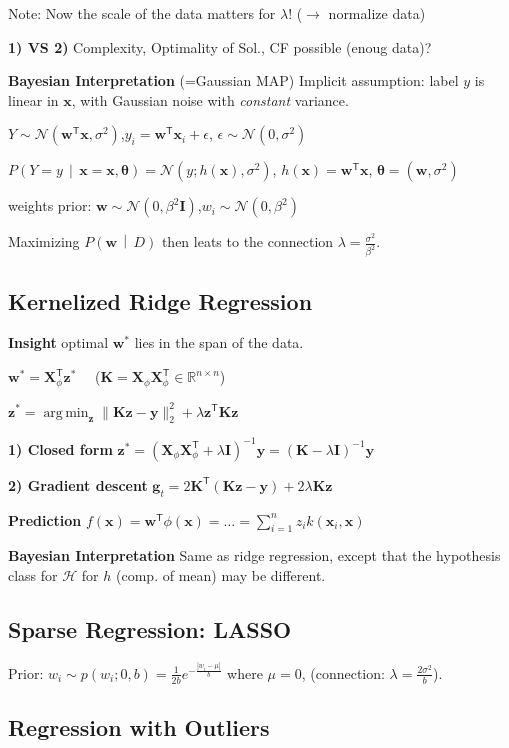 \documentclass[a4paper,8pt,landscape]{extarticle}
\newcommand{\R}{\mathbb{R}}
\newcommand{\cH}{\mathcal{H}}
\newcommand{\cN}{\mathcal{N}}
\newcommand{\abs}[1]{\left\lvert #1 \right\rvert}
\newcommand{\snorm}[1]{\lVert #1 \rVert}
\newcommand{\cProb}[2]{P\left( #1 \,\middle|\, #2 \right)}
\newcommand*{\T}{\mathsf{T}}
\DeclareMathOperator*{\argmin}{arg\,min}
\newcommand{\mat}[1]{\mathbf{#1}}
\renewcommand{\vec}[1]{\mathbf{#1}}
\newcommand{\vg}{\vec{g}}
\newcommand{\vw}{\vec{w}}
\newcommand{\vx}{\vec{x}}
\newcommand{\vy}{\vec{y}}
\newcommand{\vz}{\vec{z}}
\newcommand{\vtheta}{\boldsymbol{\theta}}
\newcommand{\MI}{\mat{I}}
\newcommand{\MK}{\mat{K}}
\newcommand{\MX}{\mat{X}}
\begin{document}
\begin{multicols*}{3}
Note: Now the scale of the data matters for $\lambda$! ($\rightarrow$ normalize
data)

\textbf{1) VS 2)} Complexity, Optimality of Sol., CF possible (enoug data)?

\textbf{Bayesian Interpretation} (=Gaussian MAP) Implicit assumption:
label $y$ is linear in $\vx$, with Gaussian noise with \emph{constant} variance.

$Y\sim\cN(\vw^\T\vx,\sigma^2)$,\quad $y_i=\vw^\T\vx_i+\epsilon$, \quad
$\epsilon\sim\cN(0,\sigma^2)$

$\cProb{Y=y}{\vx=\vx,\vtheta}=\cN(y;h(\vx),\sigma^2)$, \quad 
$h(\vx)=\vw^\T\vx$, \quad
$\vtheta=(\vw,\sigma^2)$

weights prior:
$\vw\sim\cN(0,\beta^2\MI)$,\quad $w_i\sim\cN(0,\beta^2)$

Maximizing $\cProb{\vw}{D}$ then leats to the connection
$\lambda=\frac{\sigma^2}{\beta^2}$.

\subsection{Kernelized Ridge Regression}

\textbf{Insight} optimal $\vw^*$ lies in the span of the data.

$\vw^*=\MX_\phi^\T\vz^*$ \, 
\, ($\MK=\MX_\phi\MX_\phi^\T\in\R^{n\times n}$)

$\vz^*=\argmin_{\vz} \snorm{\MK\vz-\vy}_2^2 + \lambda\vz^\T\MK\vz $

\textbf{1) Closed form} $\vz^*=(\MX_\phi\MX_\phi^\T+\lambda\MI)^{-1}\vy
=(\MK-\lambda\MI)^{-1}\vy$

\textbf{2) Gradient descent} $\vg_t=2\MK^\T(\MK\vz-\vy) + 2 \lambda\MK\vz$

\textbf{Prediction} $f(\vx)={\vw}^\T\phi(\vx)=\ldots=\sum_{i=1}^n
z_ik(\vx_i,\vx)$

\textbf{Bayesian Interpretation} Same as ridge regression, except that the
hypothesis class for $\cH$ for $h$ (comp. of mean) may be different.

\subsection{Sparse Regression: LASSO}

Prior: $w_i\sim p(w_i;0,b)=\frac{1}{2b}e^{-\frac{\abs{w_i-\mu}}{b}}$ where
$\mu=0$, (connection: $\lambda=\frac{2\sigma^2}{b}$).

\subsection{Regression with Outliers}


\end{multicols*}
\end{document}
